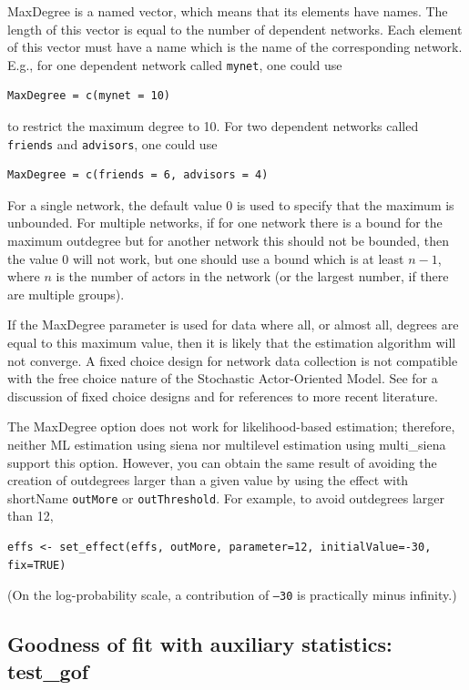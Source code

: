 \documentclass[a4paper,fleqn,11pt]{article}
\newcommand{\+}{\, + \,}
\newcommand{\saom}{{Stochastic Actor-Oriented Model}}
\begin{document}
\textsf{MaxDegree} is a named vector, which means that its elements
have names. The length of this vector
is equal to the number of dependent networks.
Each element of this vector must have a name
which is the name of the corresponding network.
E.g., for one dependent network called \texttt{mynet}, one could use
\begin{verbatim}
MaxDegree = c(mynet = 10)
\end{verbatim}
to restrict the maximum degree to 10.
For two dependent networks called \texttt{friends} and \texttt{advisors},
one could use
\begin{verbatim}
MaxDegree = c(friends = 6, advisors = 4)
\end{verbatim}

For a single network, the default value 0 is used
to specify that the maximum is unbounded.
For multiple networks, if for one network
there is a bound for the maximum outdegree
 but for another network this should not be bounded, then
 the value 0 will not work,
 but one should use a bound which is at least $n-1$,
where $n$ is the number of actors in the network (or the largest number,
if there are multiple groups).

If the \textsf{MaxDegree} parameter is used for data where
all, or almost all, degrees are equal to this maximum value,
then it is likely that the estimation algorithm will not converge.
A fixed choice design for network data collection is not
compatible with the free choice nature of the \saom.
See \citet{HollandLeinhardt1973} for a discussion of
fixed choice designs and \citet{Znidarsic2012}
for references to more recent literature.

The \textsf{MaxDegree} option does not work for likelihood-based
estimation; therefore, neither ML estimation using \textsf{siena}
nor multilevel estimation using \textsf{multi\_siena} support
this option.
However, you can obtain the same result of avoiding the creation
of outdegrees larger than a given value by using the effect with shortName
\texttt{outMore} or \texttt{outThreshold}. For example, to avoid
outdegrees larger than 12,
\begin{verbatim}
effs <- set_effect(effs, outMore, parameter=12, initialValue=-30, fix=TRUE)
\end{verbatim}
(On the log-probability scale, a contribution of \texttt{--30}  is
practically minus infinity.)

\newpage

\subsection{Goodness of fit with auxiliary statistics: \textsf{test\_gof}}
\label{S_gof}
\end{document}
